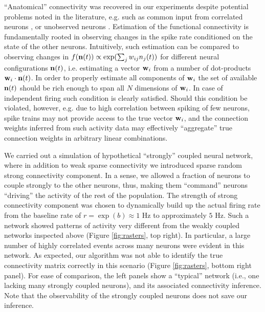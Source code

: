 \documentclass[aoas,preprint]{imsart}
\newcommand{\w}{w}
\begin{document}
``Anatomical'' connectivity was recovered in our experiments despite potential problems noted in the literature, e.g. such as common input from correlated neurons \cite{Nykamp05,NYK06}, or unobserved neurons \cite{Vidne08}. %
Estimation of the functional connectivity is fundamentally rooted in observing changes in the spike rate conditioned on the state of the other neurons. Intuitively, such estimation can be compared to observing changes in $f({\bf n}(t))\propto\exp(\sum_j \w_{ij}n_j(t))$ for different neural configurations ${\bf n}(t)$, i.e. estimating a vector ${\bf w}_i$ from a number of dot-products ${\bf w}_i\cdot {\bf n}(t)$. In order to properly estimate all components of ${\bf w}_i$ the set of available ${\bf n}(t)$ should be rich enough to span all $N$ dimensions of ${\bf w}_i$. In case of independent firing such condition is clearly satisfied.  Should this condition be violated, however, e.g. due to high correlation between spiking of few neurons, spike trains may not provide access to the true vector ${\bf w}_i$, and the connection weights inferred from such activity data may effectively ``aggregate'' true connection weights in arbitrary linear combinations.

We carried out a simulation of hypothetical ``strongly'' coupled neural network, where in addition to weak sparse connectivity we introduced sparse random strong connectivity component. In a sense, we allowed a fraction of neurons to couple strongly to the other neurons, thus, making them ``command'' neurons ``driving'' the activity of the rest of the population. The strength of strong connectivity component was chosen to dynamically build up the actual firing rate from the baseline rate of $r=\exp(b)\approx 1$ Hz to approximately $5$ Hz. Such a network showed patterns of activity very different from the weakly coupled networks inspected above (Figure \ref{fig:rasters}, top right). In particular, a large number of highly correlated events across many neurons were evident in this network. As expected, our algorithm was not able to identify the true connectivity matrix correctly in this scenario (Figure \ref{fig:rasters}, bottom right panel).  For ease of comparison, the left panels show a ``typical'' network (i.e., one lacking many strongly coupled neurons), and its associated connectivity inference.  Note that the observability of the strongly coupled neurons does not save our inference.
\end{document}
